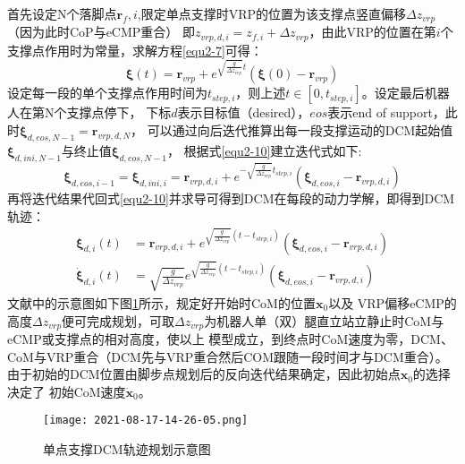             首先设定N个落脚点$\boldsymbol{r}_f,i$,限定单点支撑时VRP的位置为该支撑点竖直偏移$\varDelta z_{vrp}$（因为此时CoP与eCMP重合）
            即$z_{vrp,d,i}=z_{f,i}+\varDelta z_{vrp}$，由此VRP的位置在第$i$个支撑点作用时为常量，求解方程\ref{equ2-7}可得：
            \begin{equation}
                \boldsymbol{\xi }\left( t \right) =\boldsymbol{r}_{vrp}+e^{\sqrt{\frac{g}{\varDelta z_{vrp}}}t}\left( \boldsymbol{\xi }\left( 0 \right) -\boldsymbol{r}_{vrp} \right)
                \label{equ2-10}
            \end{equation}
            设定每一段的单个支撑点作用时间为$t_{step,i}$，则上述$t\in \left[ 0,t_{step,i} \right]$。设定最后机器人在第N个支撑点停下，
            下标$d$表示目标值（desired），$eos$表示end of support，此时$\boldsymbol{\xi}_{d,eos,N-1}=\boldsymbol{r}_{vrp,d,N}$，
            可以通过向后迭代推算出每一段支撑运动的DCM起始值$\boldsymbol{\xi}_{d,ini,N-1}$与终止值$\boldsymbol{\xi}_{d,eos,N-1}$，
            根据式\ref{equ2-10}建立迭代式如下:
            \begin{equation}
                \boldsymbol{\xi }_{d,eos,i-1}=\boldsymbol{\xi }_{d,ini,i}=\boldsymbol{r}_{vrp,d,i}+e^{-\sqrt{\frac{g}{\varDelta z_{vrp}}}t_{step,i}}\left( \boldsymbol{\xi }_{d,eos,i}-\boldsymbol{r}_{vrp,d,i} \right) 
                \label{equ2-11}
            \end{equation}
            再将迭代结果代回式\ref{equ2-10}并求导可得到DCM在每段的动力学解，即得到DCM轨迹：
            \begin{subequations}
                \begin{align}
                    \boldsymbol{\xi }_{d,i}\left( t \right) &=\boldsymbol{r}_{vrp,d,i}+e^{\sqrt{\frac{g}{\varDelta z_{vrp}}}\left( t-t_{step,i} \right)}\left( \boldsymbol{\xi }_{d,eos,i}-\boldsymbol{r}_{vrp,d,i} \right) 
                    \label{equ2-12a}\\
                    \boldsymbol{\dot{\xi}}_{d,i}\left( t \right) &=\sqrt{\frac{g}{\varDelta z_{vrp}}}e^{\sqrt{\frac{g}{\varDelta z_{vrp}}}\left( t-t_{step,i} \right)}\left( \boldsymbol{\xi }_{d,eos,i}-\boldsymbol{r}_{vrp,d,i} \right) 
                    \label{equ2-12b}
                \end{align}
            \end{subequations}
            文献\cite{englsbergerThreedimensionalBipedalWalking2013}中的示意图如下图\ref{fig2-3}所示，规定好开始时CoM的位置$\boldsymbol{x}_0$以及
            VRP偏移eCMP的高度$\varDelta z_{vrp}$便可完成规划，可取$\varDelta z_{vrp}$为机器人单（双）腿直立站立静止时CoM与eCMP或支撑点的相对高度，使以上
            模型成立，到终点时CoM速度为零，DCM、CoM与VRP重合（DCM先与VRP重合然后COM跟随一段时间才与DCM重合）。由于初始的DCM位置由脚步点规划后的反向迭代结果确定，因此初始点$\boldsymbol{x}_0$的选择决定了
            初始CoM速度$\boldsymbol{\dot{x}}_0$。
            \begin{figure}[h] 
                \centering
                \texttt{[image: 2021-08-17-14-26-05.png]}
                \caption{单点支撑DCM轨迹规划示意图} \label{fig2-3}
            \end{figure}
            \FloatBarrier

